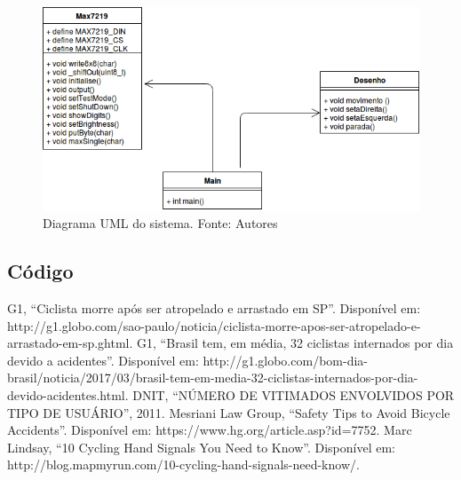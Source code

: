 \documentclass[conference]{IEEEtran}
\begin{document}
\begin{figure}[H]
  \centering
  \includegraphics[width=0.9\linewidth]{uml}
  \caption{Diagrama UML do sistema. Fonte: Autores}
  \label{fig:uml}
\end{figure}

\subsection{Código}

\begin{thebibliography}{00}
   G1, ``Ciclista morre após ser atropelado e arrastado em SP''. Disponível em: http://g1.globo.com/sao-paulo/noticia/ciclista-morre-apos-ser-atropelado-e-arrastado-em-sp.ghtml.
   G1, ``Brasil tem, em média, 32 ciclistas internados por dia devido a acidentes''. Disponível em: http://g1.globo.com/bom-dia-brasil/noticia/2017/03/brasil-tem-em-media-32-ciclistas-internados-por-dia-devido-acidentes.html.
   DNIT, ``NÚMERO DE VITIMADOS ENVOLVIDOS POR TIPO DE USUÁRIO'', 2011.
   Mesriani Law Group, ``Safety Tips to Avoid Bicycle Accidents''. Disponível em: https://www.hg.org/article.asp?id=7752.
   Marc Lindsay, ``10 Cycling Hand Signals You Need to Know''. Disponível em: http://blog.mapmyrun.com/10-cycling-hand-signals-need-know/.


\end{thebibliography}
\end{document}
